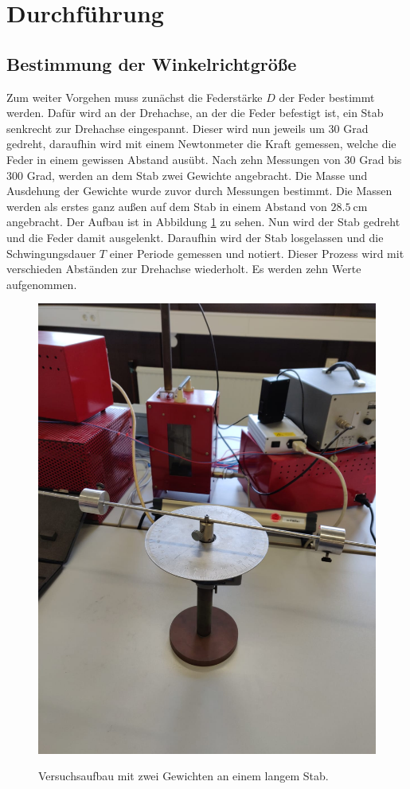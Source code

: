 \section{Durchführung}
\label{sec:Durchführung}
\subsection{Bestimmung der Winkelrichtgröße}
Zum weiter Vorgehen muss zunächst die Federstärke $D$ der Feder bestimmt werden.
Dafür wird an der Drehachse, an der die Feder befestigt ist, ein Stab senkrecht zur Drehachse eingespannt.
Dieser wird nun jeweils um 30 Grad gedreht, daraufhin wird mit einem Newtonmeter die Kraft gemessen, welche die Feder in einem gewissen Abstand ausübt.
Nach zehn Messungen von 30 Grad bis 300 Grad, werden an dem Stab zwei Gewichte angebracht.
Die Masse und Ausdehung der Gewichte wurde zuvor durch Messungen bestimmt.
Die Massen werden als erstes ganz außen auf dem Stab in einem Abstand von $\SI{28.5}{\centi\meter}$ angebracht.
Der Aufbau ist in Abbildung \ref{fig:StabmitGewicht} zu sehen.
Nun wird der Stab gedreht und die Feder damit ausgelenkt.
Daraufhin wird der Stab losgelassen und die Schwingungsdauer $T$ einer Periode gemessen und notiert.
Dieser Prozess wird mit verschieden Abständen zur Drehachse wiederholt.
Es werden zehn Werte aufgenommen.

\begin{figure}
\centering
\caption{Versuchsaufbau mit zwei Gewichten an einem langem Stab.}
\includegraphics[scale=0.1]{content/data/StabmitGewichten.png}
\label{fig:StabmitGewicht}
\end{figure}

